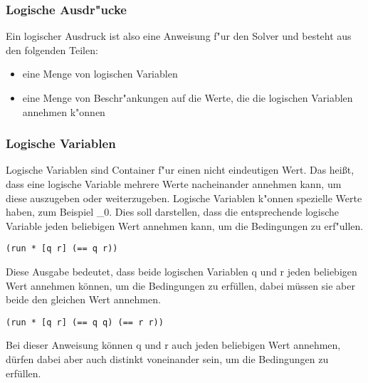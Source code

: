 
\subsubsection{Logische Ausdr"ucke}

Ein logischer Ausdruck ist also eine Anweisung f"ur den Solver und besteht aus den folgenden Teilen:
\begin{itemize}

\item eine Menge von logischen Variablen

\item eine Menge von Beschr"ankungen auf die Werte, die die logischen Variablen annehmen k"onnen

\end{itemize}


\subsubsection{Logische Variablen}
Logische Variablen sind Container f"ur einen nicht eindeutigen Wert. Das hei\ss{}t, dass eine logische Variable mehrere Werte nacheinander annehmen kann, um diese auszugeben oder weiterzugeben.
Logische Variablen k"onnen spezielle Werte haben, zum Beispiel \_0. Dies soll darstellen, dass die entsprechende logische Variable jeden beliebigen Wert annehmen kann, um die Bedingungen zu erf"ullen.

\begin{lstlisting}
(run * [q r] (== q r))
\end{lstlisting}
\begin{flushleft}
\end{flushleft}
Diese Ausgabe bedeutet, dass beide logischen Variablen q und r jeden beliebigen Wert annehmen können, um die Bedingungen zu erfüllen, dabei müssen sie aber beide den gleichen Wert annehmen.

\begin{lstlisting}
(run * [q r] (== q q) (== r r))
\end{lstlisting}
\begin{flushleft}
\end{flushleft}
Bei dieser Anweisung können q und r auch jeden beliebigen Wert annehmen, dürfen dabei aber auch distinkt voneinander sein, um die Bedingungen zu erfüllen.\\


